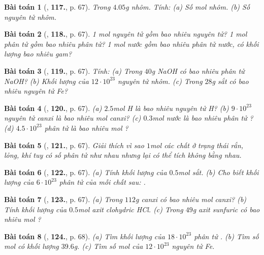 \documentclass{article}
\numberwithin{equation}{section}
\newtheorem{baitoan}{Bài toán}
\begin{document}
\begin{baitoan}[\cite{An_400_BT_Hoa_Hoc_8_2020}, \textbf{117.}, p. 67]
	Trong $4.05$\emph{g} nhôm. Tính: (a) Số mol nhôm. (b) Số nguyên tử nhôm.
\end{baitoan}

\begin{baitoan}[\cite{An_400_BT_Hoa_Hoc_8_2020}, \textbf{118.}, p. 67]
	1 mol nguyên tử gồm bao nhiêu nguyên tử? 1 mol phân tử gồm bao nhiêu phân tử? 1 mol nước gồm bao nhiêu phân tử nước, có khối lượng bao nhiêu gam?
\end{baitoan}

\begin{baitoan}[\cite{An_400_BT_Hoa_Hoc_8_2020}, \textbf{119.}, p. 67]
	Tính: (a) Trong $40$\emph{g} \emph{NaOH} có bao nhiêu phân tử \emph{NaOH}? (b) Khối lượng của $12\cdot10^{23}$ nguyên tử nhôm. (c) Trong $28$\emph{g} sắt có bao nhiêu nguyên tử \emph{Fe}?
\end{baitoan}

\begin{baitoan}[\cite{An_400_BT_Hoa_Hoc_8_2020}, \textbf{120.}, p. 67]
	(a) $2.5$\emph{mol H} là bao nhiêu nguyên tử \emph{H}? (b) $9\cdot10^{23}$ nguyên tử canxi là bao nhiêu mol canxi? (c) $0.3$\emph{mol} nước là bao nhiêu phân tử \emph{}? (d) $4.5\cdot10^{23}$ phân tử \emph{} là bao nhiêu \emph{mol }?
\end{baitoan}

\begin{baitoan}[\cite{An_400_BT_Hoa_Hoc_8_2020}, \textbf{121.}, p. 67]
	Giải thích vì sao $1$\emph{mol} các chất ở trạng thái rắn, lỏng, khí tuy có số phân tử như nhau nhưng lại có thể tích không bằng nhau.
\end{baitoan}

\begin{baitoan}[\cite{An_400_BT_Hoa_Hoc_8_2020}, \textbf{122.}, p. 67]
	(a) Tính khối lượng của $0.5$\emph{mol} sắt. (b) Cho biết khối lượng của $6\cdot10^{23}$ phân tử của mỗi chất sau: \emph{}.
\end{baitoan}

\begin{baitoan}[\cite{An_400_BT_Hoa_Hoc_8_2020}, \textbf{123.}, p. 67]
	(a) Trong $112$\emph{g} canxi có bao nhiêu mol canxi? (b) Tính khối lượng của $0.5$\emph{mol} axit clohydric \emph{HCl}. (c) Trong $49$\emph{g} axit sunfuric có bao nhiêu mol \emph{}?
\end{baitoan}

\begin{baitoan}[\cite{An_400_BT_Hoa_Hoc_8_2020}, \textbf{124.}, p. 68]
	(a) Tìm khối lượng của $18\cdot10^{23}$ phân tử \emph{}. (b) Tìm số mol \emph{} có khối lượng $39.6$\emph{g}. (c) Tìm số mol của $12\cdot10^{23}$ nguyên tử \emph{Fe}.
\end{baitoan}
\end{document}

